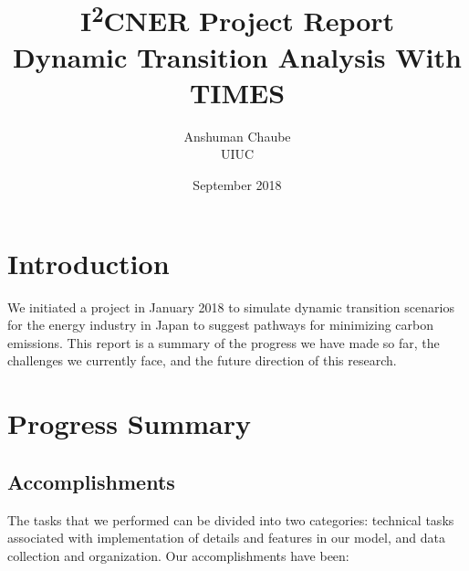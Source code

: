 \documentclass[14pt,a4paper]{article} %
\title{I\textsuperscript{2}CNER Project Report \\ Dynamic Transition Analysis With TIMES}
\date{September 2018}
\author{Anshuman Chaube\\UIUC}
\begin{document}
\maketitle

\section{Introduction}
We initiated a project in January 2018 to simulate dynamic transition scenarios for the energy industry in Japan to suggest pathways for minimizing carbon emissions. This report is a summary of the progress we have made so far, the challenges we currently face, and the future direction of this research. 

\section{Progress Summary}

\subsection{Accomplishments}

The tasks that we performed can be divided into two categories: technical tasks associated with implementation of details and features in our model, and data collection and organization. Our accomplishments have been:
\end{document}
